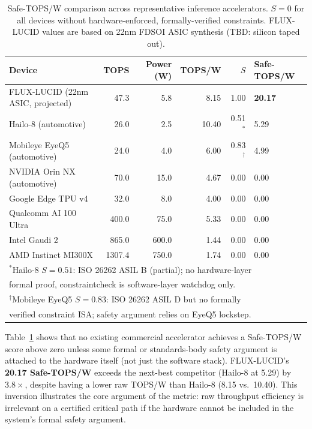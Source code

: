 \documentclass[conference]{IEEEtran}
\begin{document}
\begin{table}[t]
\centering
\caption{Safe-TOPS/W comparison across representative inference accelerators.
$S = 0$ for all devices without hardware-enforced, formally-verified constraints.
FLUX-LUCID values are based on 22nm FDSOI ASIC synthesis (TBD: silicon taped out).}
\label{tab:safetops}
\renewcommand{\arraystretch}{1.25}
\begin{tabular}{lrrrrl}
\toprule
\textbf{Device} & \textbf{TOPS} & \textbf{Power (W)} &
\textbf{TOPS/W} & $S$ & \textbf{Safe-TOPS/W} \\
\midrule
FLUX-LUCID (22nm ASIC, projected)  & 47.3 & 5.8  & 8.15 & 1.00 & \textbf{20.17} \\
\midrule
Hailo-8 (automotive)               & 26.0 & 2.5  & 10.40 & 0.51$^*$ & 5.29 \\
Mobileye EyeQ5 (automotive)        & 24.0 & 4.0  & 6.00 & 0.83$^\dagger$ & 4.99 \\
\midrule
NVIDIA Orin NX (automotive)        & 70.0 & 15.0 & 4.67 & 0.00 & 0.00 \\
Google Edge TPU v4                 & 32.0 & 8.0  & 4.00 & 0.00 & 0.00 \\
Qualcomm AI 100 Ultra              & 400.0 & 75.0 & 5.33 & 0.00 & 0.00 \\
Intel Gaudi 2                      & 865.0 & 600.0 & 1.44 & 0.00 & 0.00 \\
AMD Instinct MI300X                & 1307.4 & 750.0 & 1.74 & 0.00 & 0.00 \\
\bottomrule
\multicolumn{6}{l}{%
  \footnotesize $^*$Hailo-8 $S=0.51$: ISO 26262 ASIL B (partial); no hardware-layer} \\
\multicolumn{6}{l}{%
  \footnotesize \quad formal proof, constraintcheck is software-layer watchdog only.} \\
\multicolumn{6}{l}{%
  \footnotesize $^\dagger$Mobileye EyeQ5 $S=0.83$: ISO 26262 ASIL D but no formally} \\
\multicolumn{6}{l}{%
  \footnotesize \quad verified constraint ISA; safety argument relies on EyeQ5 lockstep.} \\
\end{tabular}
\end{table}

Table~\ref{tab:safetops} shows that no existing commercial accelerator achieves
a Safe-TOPS/W score above zero unless some formal or standards-body safety
argument is attached to the hardware itself (not just the software stack).
FLUX-LUCID's \textbf{20.17 Safe-TOPS/W} exceeds the next-best competitor
(Hailo-8 at 5.29) by $3.8\times$, despite having a lower raw TOPS/W than
Hailo-8 (8.15 vs.\ 10.40).
This inversion illustrates the core argument of the metric: raw throughput
efficiency is irrelevant on a certified critical path if the hardware cannot
be included in the system's formal safety argument.
\end{document}
